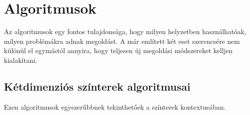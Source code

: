 

\chapter{Algoritmusok}
Az algoritmusok egy fontos tulajdonsága, hogy milyen helyzetben használhatóak, milyen problémákra adnak megoldást. A már említett két eset szerencsére nem különül el egymástól annyira, hogy teljesen új megoldási módszereket kelljen kialakítani.
\section{Kétdimenziós színterek algoritmusai}
Ezen algoritmusok egyszerűbbnek tekinthetőek a színterek kontextusában.

